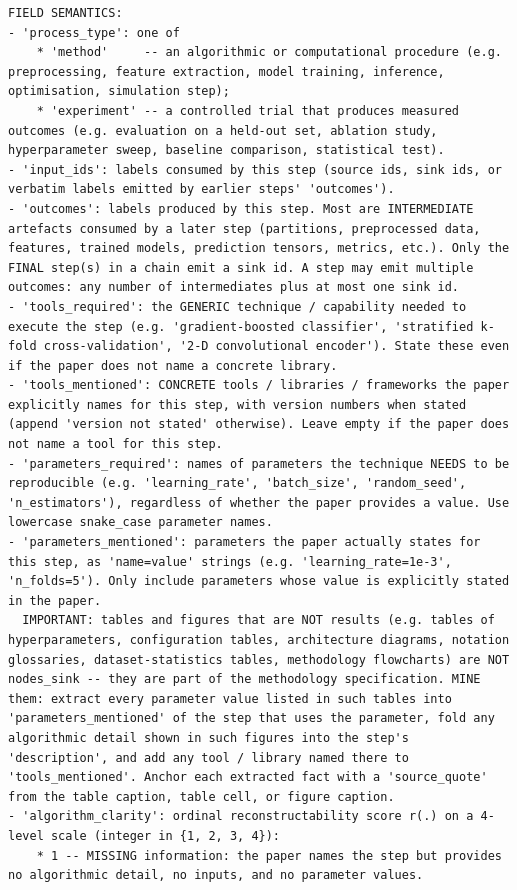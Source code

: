 \documentclass{article}
\begin{document}
\begin{lstlisting}
FIELD SEMANTICS:
- 'process_type': one of
    * 'method'     -- an algorithmic or computational procedure (e.g. preprocessing, feature extraction, model training, inference, optimisation, simulation step);
    * 'experiment' -- a controlled trial that produces measured outcomes (e.g. evaluation on a held-out set, ablation study, hyperparameter sweep, baseline comparison, statistical test).
- 'input_ids': labels consumed by this step (source ids, sink ids, or verbatim labels emitted by earlier steps' 'outcomes').
- 'outcomes': labels produced by this step. Most are INTERMEDIATE artefacts consumed by a later step (partitions, preprocessed data, features, trained models, prediction tensors, metrics, etc.). Only the FINAL step(s) in a chain emit a sink id. A step may emit multiple outcomes: any number of intermediates plus at most one sink id.
- 'tools_required': the GENERIC technique / capability needed to execute the step (e.g. 'gradient-boosted classifier', 'stratified k-fold cross-validation', '2-D convolutional encoder'). State these even if the paper does not name a concrete library.
- 'tools_mentioned': CONCRETE tools / libraries / frameworks the paper explicitly names for this step, with version numbers when stated (append 'version not stated' otherwise). Leave empty if the paper does not name a tool for this step.
- 'parameters_required': names of parameters the technique NEEDS to be reproducible (e.g. 'learning_rate', 'batch_size', 'random_seed', 'n_estimators'), regardless of whether the paper provides a value. Use lowercase snake_case parameter names.
- 'parameters_mentioned': parameters the paper actually states for this step, as 'name=value' strings (e.g. 'learning_rate=1e-3', 'n_folds=5'). Only include parameters whose value is explicitly stated in the paper.
  IMPORTANT: tables and figures that are NOT results (e.g. tables of hyperparameters, configuration tables, architecture diagrams, notation glossaries, dataset-statistics tables, methodology flowcharts) are NOT nodes_sink -- they are part of the methodology specification. MINE them: extract every parameter value listed in such tables into 'parameters_mentioned' of the step that uses the parameter, fold any algorithmic detail shown in such figures into the step's 'description', and add any tool / library named there to 'tools_mentioned'. Anchor each extracted fact with a 'source_quote' from the table caption, table cell, or figure caption.
- 'algorithm_clarity': ordinal reconstructability score r(.) on a 4-level scale (integer in {1, 2, 3, 4}):
    * 1 -- MISSING information: the paper names the step but provides no algorithmic detail, no inputs, and no parameter values.

\end{lstlisting}
\end{document}
